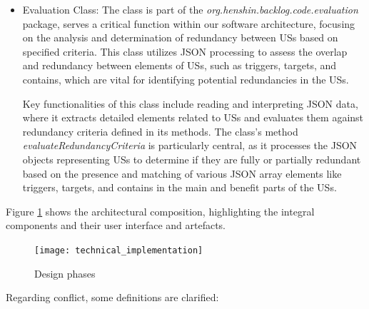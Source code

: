 \begin{itemize}
	\item Evaluation Class: The class is part of the \textit{org.henshin.backlog.code.evaluation} package, serves a critical function within our software architecture, focusing on the analysis and determination of redundancy between USs based on specified criteria. This class utilizes JSON processing to assess the overlap and redundancy between elements of USs, such as triggers, targets, and contains, which are vital for identifying potential redundancies in the USs.
	
	Key functionalities of this class include reading and interpreting JSON data, where it extracts detailed elements related to USs and evaluates them against redundancy criteria defined in its methods. The class's method \textit{evaluateRedundancyCriteria} is particularly central, as it processes the JSON objects representing USs to determine if they are fully or partially redundant based on the presence and matching of various JSON array elements like triggers, targets, and contains in the main and benefit parts of the USs.
	
\end{itemize}
Figure \ref{fig:conflict_technical_implementation} shows the architectural composition, highlighting the integral components and their user interface and artefacts.
\begin{figure}[h]
	\centering 
	\texttt{[image: technical\_implementation]}
	\caption{Design phases}\label{fig:conflict_technical_implementation}
\end{figure}
Regarding conflict, some definitions are clarified:
